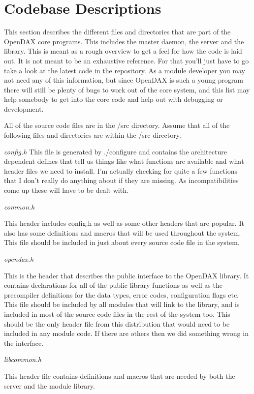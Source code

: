 \chapter{Codebase Descriptions}
This section describes the different files and directories that are part of the OpenDAX core programs.  This includes the master daemon, the server and the library.  This is meant as a rough overview to get a feel for how the code is laid out.  It is not meant to be an exhaustive reference.  For that you'll just have to go take a look at the latest code in the repository.  As a module developer you may not need any of this information, but since OpenDAX is such a young program there will still be plenty of bugs to work out of the core system, and this list may help somebody to get into the core code and help out with debugging or development.

All of the source code files are in the /src directory.  Assume that all of the following files and directories are within the /src directory.

\emph{config.h}
This file is generated by ./configure and contains the architecture dependent defines that tell us things like what functions are available and what header files we need to install. I'm actually checking for quite a few functions that I don't really do anything about if they are missing. As incompatibilities come up these will have to be dealt with.

\emph{common.h}

This header includes config.h as well as some other headers that are popular. It also has some definitions and macros that will be used throughout the system. This file should be included in just about every source code file in the system.

\emph{opendax.h}

This is the header that describes the public interface to the OpenDAX library. It contains declarations for all of the public library functions as well as the precompiler definitions for the data types, error codes, configuration flags etc. This file should be included by all modules that will link to the library, and is included in most of the source code files in the rest of the system too. This should be the only header file from this distribution that would need to be included in any module code. If there are others then we did something wrong in the interface.

\emph{libcommon.h}

This header file contains definitions and macros that are needed by both the server and the module library.


